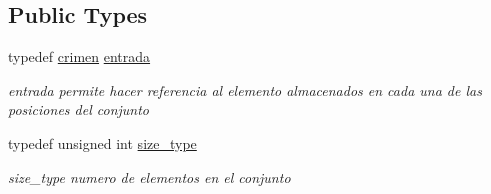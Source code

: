 \subsection*{Public Types}
\begin{DoxyCompactItemize}
\item 
\hypertarget{classconjunto_a7630ace7cb17bcec07daf5804f1a0780}{typedef \hyperlink{classcrimen}{crimen} \hyperlink{classconjunto_a7630ace7cb17bcec07daf5804f1a0780}{entrada}}\label{classconjunto_a7630ace7cb17bcec07daf5804f1a0780}

\begin{DoxyCompactList}\small\item\em entrada permite hacer referencia al elemento almacenados en cada una de las posiciones del conjunto \end{DoxyCompactList}\item 
\hypertarget{classconjunto_a0cc9902da62790ec2a6d59f4559c2df5}{typedef unsigned int \hyperlink{classconjunto_a0cc9902da62790ec2a6d59f4559c2df5}{size\-\_\-type}}\label{classconjunto_a0cc9902da62790ec2a6d59f4559c2df5}

\begin{DoxyCompactList}\small\item\em size\-\_\-type numero de elementos en el conjunto \end{DoxyCompactList}\end{DoxyCompactItemize}
